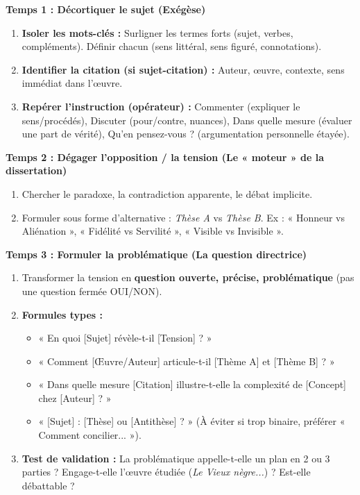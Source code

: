 \documentclass[11pt]{article}
\newcommand{\cle}[1]{{\popxbold\color{popdark}#1}}
\begin{document}
\begin{methode}
\textbf{Temps 1 : Décortiquer le sujet (Exégèse)}
\begin{enumerate}
    \item \textbf{Isoler les mots-clés :} Surligner les termes forts (sujet, verbes, compléments). Définir chacun (sens littéral, sens figuré, connotations).
    \item \textbf{Identifier la citation (si sujet-citation) :} Auteur, œuvre, contexte, sens immédiat dans l'œuvre.
    \item \textbf{Repérer l'instruction (opérateur) :} \cle{Commenter} (expliquer le sens/procédés), \cle{Discuter} (pour/contre, nuances), \cle{Dans quelle mesure} (évaluer une part de vérité), \cle{Qu'en pensez-vous ?} (argumentation personnelle étayée).
\end{enumerate}

\textbf{Temps 2 : Dégager l'opposition / la tension (Le « moteur » de la dissertation)}
\begin{enumerate}
    \item Chercher le \cle{paradoxe}, la \cle{contradiction apparente}, le \cle{débat} implicite.
    \item Formuler sous forme d'alternative : \emph{Thèse A} vs \emph{Thèse B}. Ex : « Honneur vs Aliénation », « Fidélité vs Servilité », « Visible vs Invisible ».
\end{enumerate}

\textbf{Temps 3 : Formuler la problématique (La question directrice)}
\begin{enumerate}
    \item Transformer la tension en \textbf{question ouverte, précise, problématique} (pas une question fermée OUI/NON).
    \item \textbf{Formules types :}
    \begin{itemize}
        \item « En quoi [Sujet] révèle-t-il [Tension] ? »
        \item « Comment [Œuvre/Auteur] articule-t-il [Thème A] et [Thème B] ? »
        \item « Dans quelle mesure [Citation] illustre-t-elle la complexité de [Concept] chez [Auteur] ? »
        \item « [Sujet] : [Thèse] ou [Antithèse] ? » (À éviter si trop binaire, préférer « Comment concilier... »).
    \end{itemize}
    \item \textbf{Test de validation :} La problématique appelle-t-elle un plan en 2 ou 3 parties ? Engage-t-elle l'œuvre étudiée (\emph{Le Vieux nègre...}) ? Est-elle débattable ?
\end{enumerate}


\end{methode}
\end{document}
